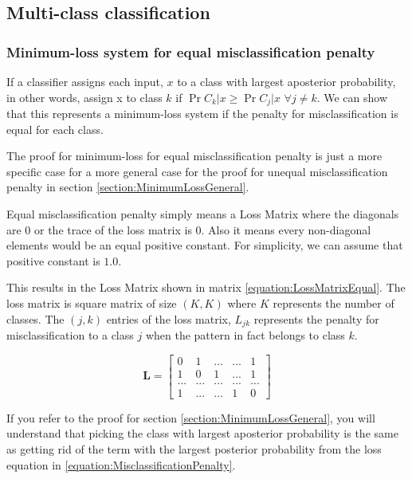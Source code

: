 \documentclass[a4paper,12pt]{article}
\begin{document}
\clearpage
\subsection{Multi-class classification}
\subsubsection{Minimum-loss system for equal misclassification penalty}
If a classifier assigns each input, $x$ to a class with largest aposterior probability,
in other words, assign x to class $k$ if $\Pr{C_{k}|x} \ge \Pr{C_{j}|x}$ $\forall j \neq k$. 
We can show that this represents a minimum-loss system if the penalty for misclassification is equal for each class. 

The proof for minimum-loss for equal misclassification penalty is just a more specific case for a more general case for the proof for unequal misclassification penalty in section \ref{section:MinimumLossGeneral}. 

Equal misclassification penalty simply means a Loss Matrix where the diagonals are 0 or the trace of the loss matrix is 0. Also it means every non-diagonal elements would be an equal positive constant. For simplicity, we can assume that positive constant is $1.0$. 

This results in the Loss Matrix shown in matrix \ref{equation:LossMatrixEqual}. The loss matrix is square matrix of size $(K,K)$ where $K$ represents the number of classes. 
The $(j,k)$ entries of the loss matrix, $L_{jk}$ represents the penalty for misclassification to a class $j$ when the pattern in fact belongs to class $k$. 

\begin{equation}
\label{equation:LossMatrixEqual}
\mathbf{L} =
  \begin{bmatrix}
    0 & 1 & ... & ... & 1 \\
    1 & 0 & 1 & ... & 1 \\
    ... & ... & ... & ... & ... \\
    1 & ... & ... & 1 & 0
  \end{bmatrix}
\end{equation}

If you refer to the proof for section \ref{section:MinimumLossGeneral}, you will understand that picking the  class with largest aposterior probability is the same as getting rid of the term with the largest posterior probability from the loss equation in \ref{equation:MisclassificationPenalty}.
\end{document}
